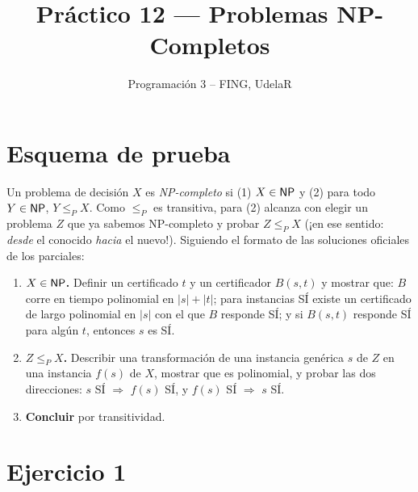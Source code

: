 
\setlength{\emergencystretch}{2em}

\newcommand{\IS}{\textsc{Independent Set}}
\newcommand{\VC}{\textsc{Vertex Cover}}
\newcommand{\SP}{\textsc{Set Packing}}
\newcommand{\PSP}{\textsc{PSP}}
\newcommand{\IPROG}{\textsc{(0--1) IPROG}}
\newcommand{\SATMON}{\textsc{SAT-MON}}
\newcommand{\SAT}{\textsc{SAT}}
\newcommand{\leP}{\le_P}
\newcommand{\SI}{S\'I}

\title{Práctico 12 --- Problemas NP-Completos}
\author{Programación 3 -- FING, UdelaR}
\date{}


\maketitle

\section*{Esquema de prueba}

Un problema de decisión $X$ es \emph{NP-completo} si (1) $X\in\mathsf{NP}$ y (2) para todo $Y\in\mathsf{NP}$, $Y\leP X$.
Como $\leP$ es transitiva, para (2) alcanza con elegir un problema $Z$ que ya sabemos NP-completo y probar
$Z\leP X$ (¡en ese sentido: \emph{desde} el conocido \emph{hacia} el nuevo!). Siguiendo el formato de las
soluciones oficiales de los parciales:

\begin{enumerate}
  \item \textbf{$X\in\mathsf{NP}$.} Definir un certificado $t$ y un certificador $B(s,t)$ y mostrar que: $B$ corre en
  tiempo polinomial en $|s|+|t|$; para instancias \SI{} existe un certificado de largo polinomial en $|s|$ con el
  que $B$ responde \SI{}; y si $B(s,t)$ responde \SI{} para algún $t$, entonces $s$ es \SI.
  \item \textbf{$Z\leP X$.} Describir una transformación de una instancia genérica $s$ de $Z$ en una instancia
  $f(s)$ de $X$, mostrar que es polinomial, y probar las dos direcciones: $s$ \SI{} $\Rightarrow$ $f(s)$ \SI, y
  $f(s)$ \SI{} $\Rightarrow$ $s$ \SI.
  \item \textbf{Concluir} por transitividad.
\end{enumerate}

\section{Ejercicio 1}

